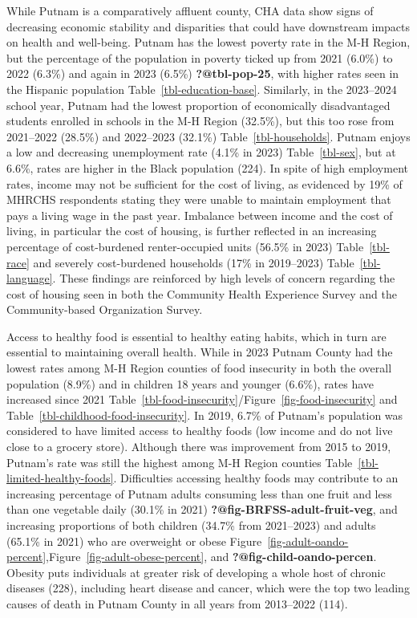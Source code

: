 \documentclass[
  english,
  letterpaper,
]{report}
\begin{document}
While Putnam is a comparatively affluent county, CHA data show signs of
decreasing economic stability and disparities that could have downstream
impacts on health and well-being. Putnam has the lowest poverty rate in
the M-H Region, but the percentage of the population in poverty ticked
up from 2021 (6.0\%) to 2022 (6.3\%) and again in 2023 (6.5\%)
\textbf{?@tbl-pop-25}, with higher rates seen in the Hispanic population
Table~\ref{tbl-education-base}. Similarly, in the 2023--2024 school
year, Putnam had the lowest proportion of economically disadvantaged
students enrolled in schools in the M-H Region (32.5\%), but this too
rose from 2021--2022 (28.5\%) and 2022--2023 (32.1\%)
Table~\ref{tbl-households}. Putnam enjoys a low and decreasing
unemployment rate (4.1\% in 2023) Table~\ref{tbl-sex}, but at 6.6\%,
rates are higher in the Black population (224). In spite of high
employment rates, income may not be sufficient for the cost of living,
as evidenced by 19\% of MHRCHS respondents stating they were unable to
maintain employment that pays a living wage in the past year. Imbalance
between income and the cost of living, in particular the cost of
housing, is further reflected in an increasing percentage of
cost-burdened renter-occupied units (56.5\% in 2023)
Table~\ref{tbl-race} and severely cost-burdened households (17\% in
2019--2023) Table~\ref{tbl-language}. These findings are reinforced by
high levels of concern regarding the cost of housing seen in both the
Community Health Experience Survey and the Community-based Organization
Survey.

Access to healthy food is essential to healthy eating habits, which in
turn are essential to maintaining overall health. While in 2023 Putnam
County had the lowest rates among M-H Region counties of food insecurity
in both the overall population (8.9\%) and in children 18 years and
younger (6.6\%), rates have increased since 2021
Table~\ref{tbl-food-insecurity}/Figure~\ref{fig-food-insecurity} and
Table~\ref{tbl-childhood-food-insecurity}. In 2019, 6.7\% of Putnam's
population was considered to have limited access to healthy foods (low
income and do not live close to a grocery store). Although there was
improvement from 2015 to 2019, Putnam's rate was still the highest among
M-H Region counties Table~\ref{tbl-limited-healthy-foods}. Difficulties
accessing healthy foods may contribute to an increasing percentage of
Putnam adults consuming less than one fruit and less than one vegetable
daily (30.1\% in 2021) \textbf{?@fig-BRFSS-adult-fruit-veg}, and
increasing proportions of both children (34.7\% from 2021--2023) and
adults (65.1\% in 2021) who are overweight or obese
Figure~\ref{fig-adult-oando-percent},Figure~\ref{fig-adult-obese-percent},
and \textbf{?@fig-child-oando-percen}. Obesity puts individuals at
greater risk of developing a whole host of chronic diseases (228),
including heart disease and cancer, which were the top two leading
causes of death in Putnam County in all years from 2013--2022 (114).
\end{document}
